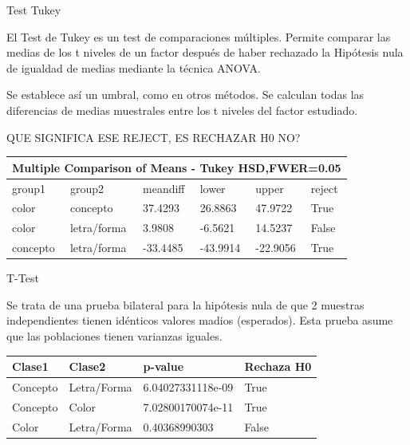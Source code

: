 \documentclass{beamer}
\begin{document}
\begin{frame}{Test Tukey}

El Test de Tukey es un test de comparaciones múltiples. Permite comparar las medias de los t niveles de un factor después de haber rechazado la Hipótesis nula de igualdad de medias mediante la técnica ANOVA. 

Se establece así un umbral, como en otros métodos. Se calculan todas las diferencias de medias muestrales entre los t niveles del factor estudiado. 

{\Large QUE SIGNIFICA ESE REJECT, ES RECHAZAR H0 NO?}


\begin{center}
    \begin{tabular}{ | p{1.7cm} | p{1.7cm} | p{1.4cm} | p{1.4cm} | p{1.4cm} | p{0.9cm} |}
    \hline
	 \multicolumn{6}{|c|}{Multiple Comparison of Means - Tukey HSD,FWER=0.05 } \\
    \hline
     group1       &  group2      & meandiff & lower    & upper    & reject \\ 
     color        &  concepto    & 37.4293  & 26.8863   &  47.9722 & True   \\ 
     color        &  letra/forma & 3.9808   & -6.5621   &  14.5237 & False  \\ 
	 concepto     &  letra/forma & -33.4485 & -43.9914 &  -22.9056  & True  \\ 
    \hline
    \end{tabular}
\end{center} 

\end{frame}


\begin{frame}{T-Test}

Se trata de una prueba bilateral para la hipótesis nula de que 2 muestras independientes tienen idénticos valores madios (esperados). Esta prueba asume que las poblaciones tienen varianzas iguales.

\begin{center}
    \begin{tabular}{ | p{2cm} | p{2cm} | p{3.5cm} | p{2cm} |}
    \hline
     Clase1       &  Clase2 			&  p-value               & Rechaza H0		\\ 
    \hline
     Concepto    &  Letra/Forma	    &  6.04027331118e-09     & True 				\\ 
     Concepto    &  Color 			&  7.02800170074e-11   	 & True				\\ 
     Color 		 &  Letra/Forma     &  0.40368990303         & False 				\\ 
    \hline
    \end{tabular}
\end{center} 

\end{frame}
\end{document}
